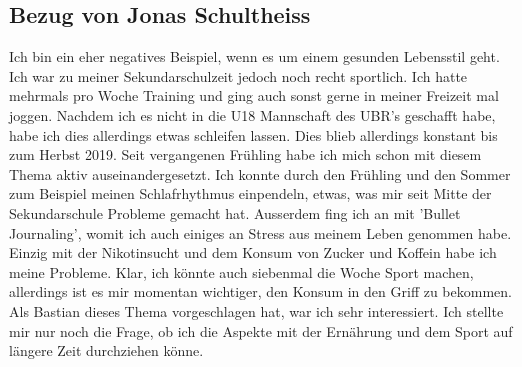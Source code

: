 \subsection{Bezug von Jonas Schultheiss}
\label{bezug:jonas}
Ich bin ein eher negatives Beispiel, wenn es um einem gesunden Lebensstil geht. Ich war zu meiner Sekundarschulzeit jedoch noch recht sportlich. Ich hatte mehrmals pro Woche Training und ging auch sonst gerne in meiner Freizeit mal joggen. Nachdem ich es nicht in die U18 Mannschaft des UBR's geschafft habe, habe ich dies allerdings etwas schleifen lassen.
\newline
Dies blieb allerdings konstant bis zum Herbst 2019. Seit vergangenen Frühling habe ich mich schon mit diesem Thema aktiv auseinandergesetzt. Ich konnte durch den Frühling und den Sommer zum Beispiel meinen Schlafrhythmus einpendeln, etwas, was mir seit Mitte der Sekundarschule Probleme gemacht hat. Ausserdem fing ich an mit 'Bullet Journaling', womit ich auch einiges an Stress aus meinem Leben genommen habe. Einzig mit der Nikotinsucht und dem Konsum von Zucker und Koffein habe ich meine Probleme. Klar, ich könnte auch siebenmal die Woche Sport machen, allerdings ist es mir momentan wichtiger, den Konsum in den Griff zu bekommen.
\newline
\newline
Als Bastian dieses Thema vorgeschlagen hat, war ich sehr interessiert. Ich stellte mir nur noch die Frage, ob ich die Aspekte mit der Ernährung und dem Sport auf längere Zeit durchziehen könne.